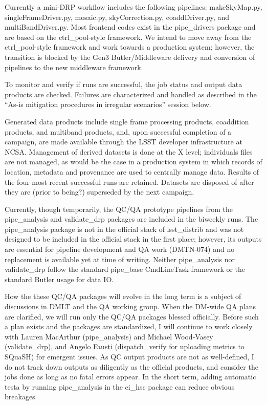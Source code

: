 \documentclass[DM,authoryear,toc]{lsstdoc}
\begin{document}
Currently a mini-DRP workflow includes the following pipelines:
makeSkyMap.py, singleFrameDriver.py, mosaic.py, skyCorrection.py,
coaddDriver.py, and multiBandDriver.py. Most frontend codes exist
in the pipe\_drivers package and are based on the ctrl\_pool-style
framework. We intend to move away from the ctrl\_pool-style framework
and work towards a production system; however, the transition is
blocked by the Gen3 Butler/Middleware delivery and conversion of
pipelines to the new middleware framework.

To monitor and verify if runs are successful, the job status and
output data products are checked. Failures are characterized and
handled as described in the “As-is mitigation procedures in irregular
scenarios” session below.

Generated data products include single frame processing products,
coaddition products, and multiband products, and, upon successful
completion of a campaign, are made available through the LSST
developer infrastructure at NCSA. Management of derived datasets
is done at the X level; individuals files are not managed, as would
be the case in a production system in which records of location,
metadata and provenance are used to centrally manage data. Results
of the four most recent successful runs are retained.  Datasets are
disposed of after they are (prior to being?) superseded by the next
campaign.

Currently, though temporarily, the QC/QA prototype pipelines from
the pipe\_analysis and validate\_drp packages are included in the
biweekly runs. The pipe\_analysis package is not in the official
stack of lsst\_distrib and was not designed to be included in the
official stack in the first place; however, its outputs are essential
for pipeline development and QA work (DMTN-074) and no replacement
is available yet at time of writing.  Neither pipe\_analysis nor
validate\_drp follow the standard pipe\_base CmdLineTask framework
or the standard Butler usage for data IO.

How the these QC/QA packages will evolve in the long term is a
subject of discussions in DMLT and the QA working group. When the
DM-wide QA plans are clarified, we will run only the QC/QA packages
blessed officially. Before such a plan exists and the packages are
standardized, I will continue to work closely with Lauren MacArthur
(pipe\_analysis) and Michael Wood-Vasey (validate\_drp), and Angelo
Fausti (dispatch\_verify for uploading metrics to SQuaSH) for
emergent issues.  As QC output products are not as well-defined, I
do not track down outputs as diligently as the official products,
and consider the jobs done as long as no fatal errors appear.  In
the short term, adding automatic testa by running pipe\_analysis
in the ci\_hsc package can reduce obvious breakages.
\end{document}
